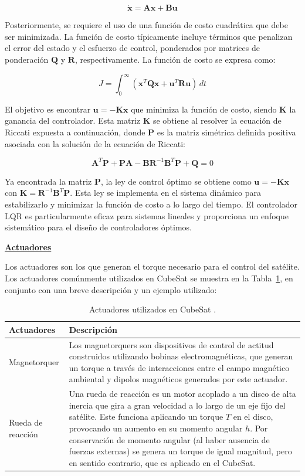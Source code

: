 \[
\dot{\mathbf{x}} = \mathbf{A} \mathbf{x} + \mathbf{B} \mathbf{u}
\]

Posteriormente, se requiere el uso de una función de costo cuadrática que debe ser minimizada. La función de costo típicamente incluye términos que penalizan el error del estado y el esfuerzo de control, ponderados por matrices de ponderación \( \mathbf{Q} \) y \( \mathbf{R} \), respectivamente. La función de costo se expresa como:

\[
J = \int_{0}^{\infty} \left( \mathbf{x}^T \mathbf{Q} \mathbf{x} + \mathbf{u}^T \mathbf{R} \mathbf{u} \right) \, dt
\]

El objetivo es encontrar \( \mathbf{u} = -\mathbf{K} \mathbf{x} \) que minimiza la función de costo, siendo \( \mathbf{K} \) la ganancia del controlador. Esta matriz \( \mathbf{K} \) se obtiene al resolver la ecuación de Riccati expuesta a continuación, donde \( \mathbf{P} \) es la matriz simétrica definida positiva asociada con la solución de la ecuación de Riccati:

\[
\mathbf{A}^T \mathbf{P} + \mathbf{P} \mathbf{A} - \mathbf{B} \mathbf{R}^{-1} \mathbf{B}^T \mathbf{P} + \mathbf{Q} = 0
\]

Ya encontrada la matriz \( \mathbf{P} \), la ley de control óptimo se obtiene como \( \mathbf{u} = -\mathbf{K} \mathbf{x} \) con \( \mathbf{K} = \mathbf{R}^{-1} \mathbf{B}^T \mathbf{P} \). Esta ley se implementa en el sistema dinámico para estabilizarlo y minimizar la función de costo a lo largo del tiempo. El controlador LQR es particularmente eficaz para sistemas lineales y proporciona un enfoque sistemático para el diseño de controladores óptimos.

\textbf{\underline{Actuadores}}

Los actuadores son los que generan el torque necesario para el control del satélite. Los actuadores comúnmente utilizados en CubeSat se muestra en la Tabla~\ref{tab:actuadores}, en conjunto con una breve descripción y un ejemplo utilizado:

\begin{table}[h!]
	\centering
	\caption{Actuadores utilizados en CubeSat \cite{ref6}.}
	\begin{tabular}{|l|p{10cm}|}
		\hline
		\textbf{Actuadores} & \textbf{Descripción} \\ \hline
		Magnetorquer & Los magnetorquers son dispositivos de control de actitud construidos utilizando bobinas electromagnéticas, que generan un torque a través de interacciones entre el campo magnético ambiental y dipolos magnéticos generados por este actuador. \\ \hline
		Rueda de reacción & Una rueda de reacción es un motor acoplado a un disco de alta inercia que gira a gran velocidad a lo largo de un eje fijo del satélite. Este funciona aplicando un torque \( T \) en el disco, provocando un aumento en su momento angular \( h \). Por conservación de momento angular (al haber ausencia de fuerzas externas) se genera un torque de igual magnitud, pero en sentido contrario, que es aplicado en el CubeSat. \\ \hline
	\end{tabular}
	\label{tab:actuadores}
\end{table}

